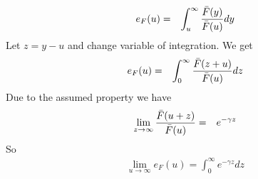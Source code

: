 \documentclass{report}
\begin{document}
\begin{enumerate}[1.]
\begin{enumerate}[(a)]
    \begin{eqnarray*}
      e_F(u) &=& \int_{u}^{\infty} {\bar{F}(y) \over \bar{F}(u)} dy
    \end{eqnarray*}
    Let $z = y - u$ and change variable of integration. We get
    \begin{eqnarray*}
      e_F(u) &=& \int_{0}^{\infty} {\bar{F}(z+u) \over \bar{F}(u)} dz
    \end{eqnarray*}
    Due to the assumed property we have
    \begin{eqnarray*}
      \lim_{z \to \infty} {\bar{F}(u+z) \over \bar{F}(u)} &=&
      e^{-\gamma z}
    \end{eqnarray*}
    So
    \begin{eqnarray*}
      \lim_{u \to \infty} e_F(u) = \int_{0}^{\infty} e^{-\gamma z} dz
    \end{eqnarray*}
  \end{enumerate}
\end{enumerate}
\end{document}
